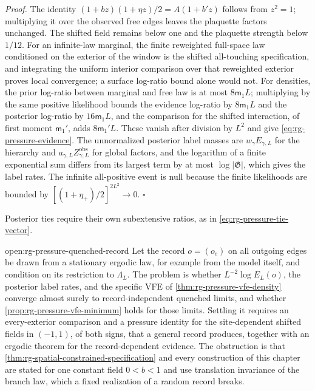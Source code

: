 \noindent\emph{Proof.}
The identity $(1+bz)(1+\eta z)/2=A(1+b'z)$ follows from $z^2=1$; multiplying
it over the observed free edges leaves the plaquette factors unchanged. The
shifted field remains below one and the plaquette strength below $1/12$. For
an infinite-law marginal, the finite reweighted full-space law conditioned on
the exterior of the window is the shifted all-touching specification, and
integrating the uniform interior comparison over that reweighted exterior
proves local convergence; a surface log-ratio bound alone would not. For
densities, the prior log-ratio between marginal and free law is at most
$8\mathsf m_1L$; multiplying by the same positive likelihood bounds the
evidence log-ratio by $8\mathsf m_1L$ and the posterior log-ratio by
$16\mathsf m_1L$, and the comparison for the shifted interaction, of first
moment $\mathsf m_1'$, adds $8\mathsf m_1'L$. These
vanish after division by $L^2$ and give \cref{eq:rg-pressure-evidence}. The
unnormalized posterior label masses are $w_\gamma E_{\gamma,L}$ for the
hierarchy and $a_{\gamma,L}Z^{\mathrm{obs}}_{\gamma,L}$ for global factors,
and the logarithm of a finite exponential sum differs from its largest term
by at most $\log|\mathfrak G|$, which gives the label rates. The infinite
all-positive event is null because the finite likelihoods are bounded by
$[(1+\eta_+)/2]^{2L^2}\to0$. $\square$

Posterior ties require their own subextensive ratios, as in
\cref{eq:rg-pressure-tie-vector}.

{open:rg-pressure-quenched-record}
Let the record $o=(o_e)$ on all outgoing edges be drawn from a stationary
ergodic law, for example from the model itself, and condition on its
restriction to $\Lambda_L$. The problem is whether $L^{-2}\log E_L(o)$, the
posterior label rates, and the specific VFE of
\cref{thm:rg-pressure-vfe-density} converge almost surely to
record-independent quenched limits, and whether
\cref{prop:rg-pressure-vfe-minimum} holds for those limits. Settling it
requires an every-exterior comparison and a pressure identity for the
site-dependent shifted fields in $(-1,1)$, of both signs, that a general
record produces, together with an ergodic theorem for the record-dependent
evidence. The obstruction is that
\cref{thm:rg-spatial-constrained-specification} and every construction of
this chapter are stated for one constant field $0<b<1$ and use translation
invariance of the branch law, which a fixed realization of a random record
breaks.

